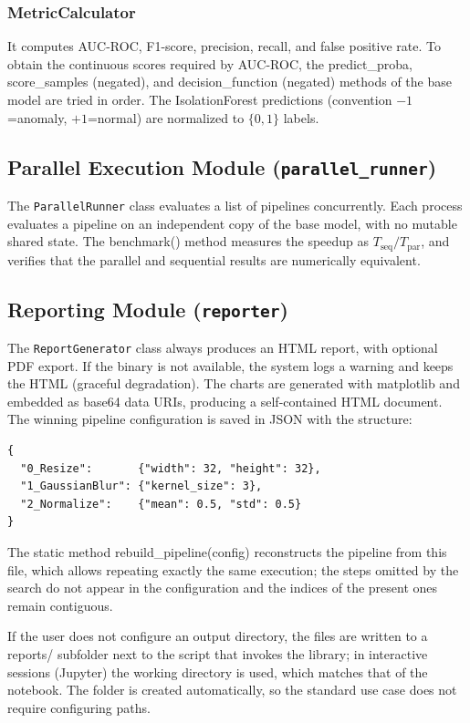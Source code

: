 \documentclass[conference]{IEEEtran}
\begin{document}
\subsubsection{MetricCalculator}

It computes AUC-ROC, F1-score, precision, recall, and false positive rate. To
obtain the continuous scores required by AUC-ROC, the predict\_proba,
score\_samples (negated), and decision\_function (negated) methods of the base
model are tried in order. The IsolationForest predictions (convention
$-1$=anomaly, $+1$=normal) are normalized to $\{0, 1\}$ labels.

\subsection{Parallel Execution Module (\texttt{parallel\_runner})}

The \texttt{ParallelRunner} class evaluates a list of pipelines concurrently.
Each process evaluates a pipeline on an independent copy of the base model,
with no mutable shared state. The benchmark() method measures the speedup as
$T_{\text{seq}} / T_{\text{par}}$, and verifies that the parallel and
sequential results are numerically equivalent.

\subsection{Reporting Module (\texttt{reporter})}

The \texttt{ReportGenerator} class always produces an HTML report, with
optional PDF export. If the binary is not available, the system logs a warning
and keeps the HTML (graceful degradation). The charts are generated with
matplotlib and embedded as base64 data URIs, producing a self-contained HTML
document. The winning pipeline configuration is saved in JSON with the
structure:
\begin{lstlisting}
{
  "0_Resize":       {"width": 32, "height": 32},
  "1_GaussianBlur": {"kernel_size": 3},
  "2_Normalize":    {"mean": 0.5, "std": 0.5}
}
\end{lstlisting}
The static method rebuild\_pipeline(config) reconstructs the pipeline from this
file, which allows repeating exactly the same execution; the steps omitted by
the search do not appear in the configuration and the indices of the present
ones remain contiguous.

If the user does not configure an output directory, the files are written to a
reports/ subfolder next to the script that invokes the library; in interactive
sessions (Jupyter) the working directory is used, which matches that of the
notebook. The folder is created automatically, so the standard use case does
not require configuring paths.
\end{document}
